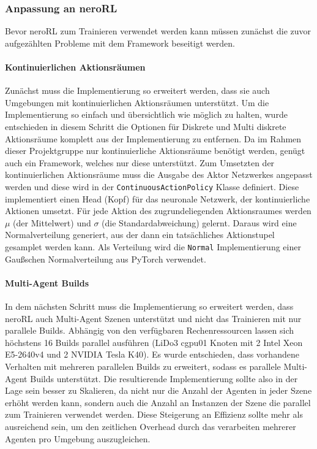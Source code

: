 \subsubsection{Anpassung an neroRL} \label{neroAnpassungKonzept}
Bevor neroRL zum Trainieren verwendet werden kann müssen zunächst die zuvor aufgezählten Probleme mit dem Framework beseitigt werden.\\

\paragraph{Kontinuierlichen Aktionsräumen} \fup
Zunächst muss die Implementierung so erweitert werden, dass sie auch Umgebungen mit kontinuierlichen Aktionsräumen unterstützt. 
Um die Implementierung so einfach und übersichtlich wie möglich zu halten, wurde entschieden in diesem Schritt die Optionen für Diskrete und Multi diskrete Aktionsräume komplett aus der Implementierung zu entfernen. Da im Rahmen dieser Projektgruppe nur kontinuierliche Aktionsräume benötigt werden, genügt auch ein Framework, welches nur diese unterstützt. Zum Umsetzten der kontinuierlichen Aktionsräume muss die Ausgabe des Aktor Netzwerkes angepasst werden und diese wird in der \texttt{ContinuousActionPolicy} Klasse definiert. Diese implementiert einen Head (Kopf) für das neuronale Netzwerk, der kontinuierliche Aktionen umsetzt. Für jede Aktion des zugrundeliegenden Aktionsraumes werden $\mu$ (der Mittelwert) und $\sigma$ (die Standardabweichung) gelernt. Daraus wird eine Normalverteilung generiert, aus der dann ein tatsächliches Aktionstupel gesamplet werden kann. Als Verteilung wird die \texttt{Normal} Implementierung einer Gaußschen Normalverteilung aus PyTorch verwendet.

\paragraph{Multi-Agent Builds} \fup
In dem nächsten Schritt muss die Implementierung so erweitert werden, dass neroRL auch Multi-Agent Szenen unterstützt und nicht das Trainieren mit nur parallele Builds.
Abhängig von den verfügbaren Rechenressourcen lassen sich höchstens 16 Builds parallel ausführen (LiDo3 cgpu01 Knoten mit 2 Intel Xeon E5-2640v4 und 2 NVIDIA Tesla K40). 
Es wurde entschieden, dass vorhandene Verhalten mit mehreren parallelen Builds zu erweitert, sodass es parallele Multi-Agent Builds unterstützt. 
Die resultierende Implementierung sollte also in der Lage sein besser zu Skalieren, da nicht nur die Anzahl der Agenten in jeder Szene erhöht werden kann, sondern auch die Anzahl an Instanzen der Szene die parallel zum Trainieren verwendet werden. Diese Steigerung an Effizienz sollte mehr als ausreichend sein, um den zeitlichen Overhead durch das verarbeiten mehrerer Agenten pro Umgebung auszugleichen.

